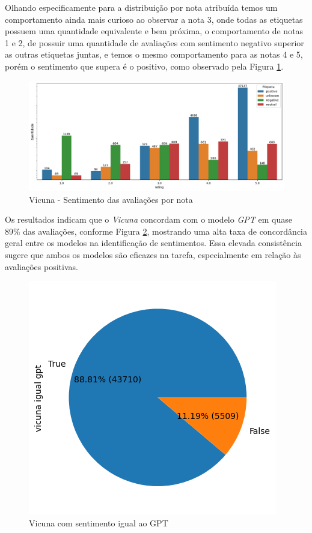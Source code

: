 Olhando especificamente para a distribuição por nota atribuída temos um comportamento ainda mais curioso ao observar a nota 3, onde todas as etiquetas possuem uma quantidade equivalente e bem próxima, o comportamento de notas 1 e 2, de possuir uma quantidade de avaliações com sentimento negativo superior as outras etiquetas juntas, e temos o mesmo comportamento para as notas 4 e 5, porém o sentimento que supera é o positivo, como observado pela Figura \ref{img:vicuna_sentimento_nota}.

\begin{figure}
	\centering
	\includegraphics[width=1\textwidth]{figs/vicuna/sentimento_nota.png}
	\caption{Vicuna - Sentimento das avaliações por nota}
	\label{img:vicuna_sentimento_nota}
\end{figure}

Os resultados indicam que o \textit{Vicuna} concordam com o modelo \textit{GPT} em quase 89\% das avaliações, conforme Figura \ref{img:vicuna_vs_gpt}, mostrando uma alta taxa de concordância geral entre os modelos na identificação de sentimentos. Essa elevada consistência sugere que ambos os modelos são eficazes na tarefa, especialmente em relação às avaliações positivas.

\begin{figure}
	\centering
	\includegraphics{figs/vicuna/vs_gpt.png}
	\caption{Vicuna com sentimento igual ao GPT}
	\label{img:vicuna_vs_gpt}
\end{figure}

